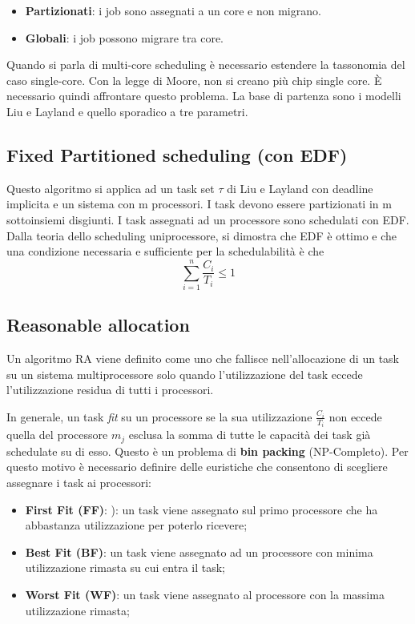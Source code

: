\documentclass[11pt,a4paper]{report}
\begin{document}
\begin{itemize}
    \item \textbf{Partizionati}: i job sono assegnati a un core e non migrano.
    \item \textbf{Globali}: i job possono migrare tra core.
\end{itemize}

Quando si parla di multi-core scheduling è necessario estendere la tassonomia del caso single-core. Con la legge di Moore, non si creano più chip single core. È necessario quindi affrontare questo problema. La base di partenza sono i modelli Liu e Layland e quello sporadico a tre parametri.

\subsection{Fixed Partitioned scheduling (con EDF)}

Questo algoritmo si applica ad un task set $\tau$ di Liu e Layland con deadline implicita e un sistema con m processori. I task devono essere partizionati in m sottoinsiemi disgiunti. I task assegnati ad un processore sono schedulati con EDF. Dalla teoria dello scheduling uniprocessore, si dimostra che EDF è ottimo e che una condizione necessaria e sufficiente per la schedulabilità è che
\begin{equation}
    \sum_{i=1}^n \frac{C_i}{T_i} \leq 1
\end{equation}

\subsection{Reasonable allocation}

Un algoritmo RA viene definito come uno che fallisce nell'allocazione di un task su un sistema multiprocessore solo quando l'utilizzazione del task eccede l'utilizzazione residua di tutti i processori.

In generale, un task \textit{fit} su un processore se la sua utilizzazione $\frac{C_i}{T_i}$ non eccede quella del processore $m_j$ esclusa la somma di tutte le capacità dei task già schedulate su di esso. Questo è un problema di \textbf{bin packing} (NP-Completo). Per questo motivo è necessario definire delle euristiche che consentono di scegliere assegnare i task ai
processori:

\begin{itemize}
    \item \textbf{First Fit (FF)}: ): un task viene assegnato sul primo processore che ha abbastanza utilizzazione per poterlo ricevere;
    \item \textbf{Best Fit (BF)}: un task viene assegnato ad un processore con minima utilizzazione rimasta su cui entra il task;
    \item \textbf{Worst Fit (WF)}: un task viene assegnato al processore con la massima utilizzazione rimasta;
\end{itemize}
\end{document}
